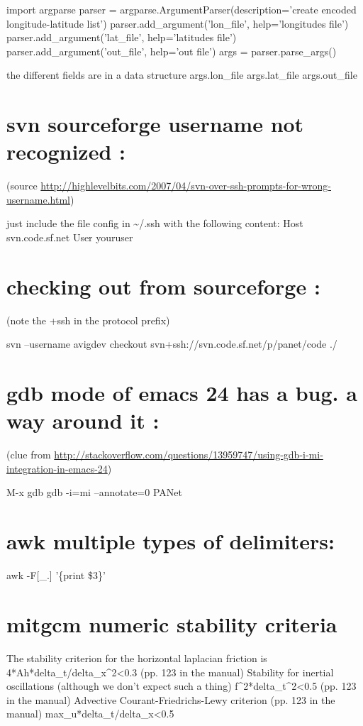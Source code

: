 \documentclass[11pt]{article}
\begin{document}
import argparse
parser = argparse.ArgumentParser(description='create encoded longitude-latitude list')
parser.add\_argument('lon\_file', help='longitudes file')
parser.add\_argument('lat\_file', help='latitudes file')
parser.add\_argument('out\_file', help='out file')
args = parser.parse\_args()

the different fields are in a data structure args.lon\_file args.lat\_file args.out\_file
\section{svn sourceforge username not recognized :}
\label{sec-19}
(source \url{http://highlevelbits.com/2007/04/svn-over-ssh-prompts-for-wrong-username.html})

just include the file config in \textasciitilde{}/.ssh with the following content:
Host svn.code.sf.net
  User youruser

\section{checking out from sourceforge :}
\label{sec-20}

(note the +ssh in the protocol prefix)

svn --username avigdev checkout svn+ssh://svn.code.sf.net/p/panet/code ./
\section{gdb mode of emacs 24 has a bug. a way around it :}
\label{sec-21}
(clue from \url{http://stackoverflow.com/questions/13959747/using-gdb-i-mi-integration-in-emacs-24})

M-x gdb
gdb -i=mi --annotate=0 PANet
\section{awk multiple types of delimiters:}
\label{sec-22}
awk -F[\_.] '\{print \$3\}'
\section{mitgcm numeric stability criteria}
\label{sec-23}

The stability criterion for the horizontal laplacian friction is 
4*Ah*delta\_t/delta\_x\^{}2<0.3 (pp. 123 in the manual)
Stability for inertial oscillations (although we don't expect such a thing)
f\^{}2*delta\_t\^{}2<0.5 (pp. 123 in the manual)
Advective Courant-Friedrichs-Lewy criterion (pp. 123 in the manual)
max\_u*delta\_t/delta\_x<0.5
\end{document}
